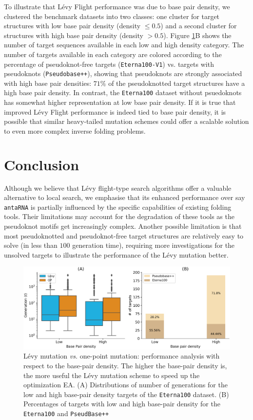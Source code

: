 To illustrate that Lévy Flight performance was due to base pair density, we clustered the benchmark datasets into two classes: one cluster for target structures with low base pair density (density $\leq 0.5$) and a second cluster for structures with high base pair density (density $> 0.5$). Figure \ref{Fig:diversity2}B shows the number of target sequences available in each low and high density category. The number of targets available in each category are colored according to the percentage of pseudoknot-free targets (\texttt{Eterna100-V1}) vs. targets with pseudoknots (\texttt{Pseudobase++}), showing that pseudoknots are strongly associated with high base pair densities: $71\%$ of the pseudoknotted target structures have a high base pair density.  In contrast, the \texttt{Eterna100} dataset without psuedoknots has somewhat higher representation at low base pair density. If it is true that improved Lévy Flight performance is indeed tied to base pair density, it is possible that similar heavy-tailed mutation schemes could offer a scalable solution to even more complex inverse folding problems. 

\section*{Conclusion}
Although we believe that Lévy flight-type search algorithms offer a valuable alternative to local search, we emphasise that its enhanced performance over say \texttt{antaRNA} is partially influenced by the specific capabilities of existing folding tools. Their limitations may account for the degradation of these tools as the pseudoknot motifs get increasingly complex. Another possible limitation is that most pseudoknotted and pseudoknot-free target structures are relatively easy to solve (in less than $100$ generation time), requiring more investigations for the unsolved targets to illustrate the performance of the Lévy mutation better.



\begin{figure}[t!]
	\centering
	\includegraphics[width=1.05\linewidth]{../res/images/arnaque/levy_analysis.pdf}
	\small
	\caption{Lévy mutation \emph{vs.} one-point mutation: performance analysis with respect to the base-pair density. The higher the base-pair density is, the more useful the Lévy mutation scheme to speed up the optimization EA. (A) Distributions of number of generations for the low and high base-pair density targets of the \texttt{Eterna100} dataset. (B) Percentages of targets with low and high base-pair density for the \texttt{Eterna100} and \texttt{PseudBase++}}\label{Fig:diversity2}
\end{figure}

